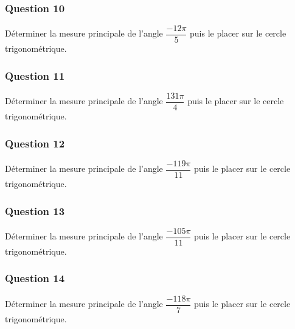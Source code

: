 \documentclass[15pt, mathserif]{beamer}
\begin{document}
\begin{frame} 
	\frametitle{Question 10}
Déterminer la mesure principale de l'angle $\dfrac{-12\pi}{5}$ puis le placer sur le cercle trigonométrique.\end{frame}


\begin{frame} 
	\frametitle{Question 11}
Déterminer la mesure principale de l'angle $\dfrac{131\pi}{4}$ puis le placer sur le cercle trigonométrique.\end{frame}


\begin{frame} 
	\frametitle{Question 12}
Déterminer la mesure principale de l'angle $\dfrac{-119\pi}{11}$ puis le placer sur le cercle trigonométrique.\end{frame}


\begin{frame} 
	\frametitle{Question 13}
Déterminer la mesure principale de l'angle $\dfrac{-105\pi}{11}$ puis le placer sur le cercle trigonométrique.\end{frame}


\begin{frame} 
	\frametitle{Question 14}
Déterminer la mesure principale de l'angle $\dfrac{-118\pi}{7}$ puis le placer sur le cercle trigonométrique.\end{frame}
\end{document}
